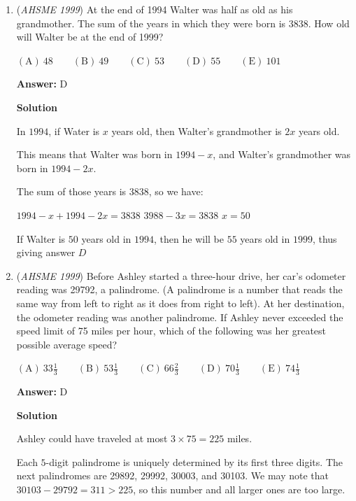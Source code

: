 \begin{enumerate}
 Three acute angles and three obtuse angles work.  For example, if you pick three acute angles of $80$ degrees, the three obtuse angles would be $160$ degrees and give a sum of $80\cdot 3 + 160\cdot 3 = 720$ degrees, which is a genuine hexagon.  Thus, the answer is $\boxed{(B) 3}$



	\item (\textit{AHSME 1999}) At the end of 1994 Walter was half as old as his grandmother. The sum of the years in which they were born is 3838. How old will Walter be at the end of 1999?


 $\mathrm{(A) \ } 48 \qquad \mathrm{(B) \ }49 \qquad \mathrm{(C) \ }53 \qquad \mathrm{(D) \ }55 \qquad \mathrm{(E) \ } 101$

 \textbf{Answer: }D



\textbf{Solution}

In $1994$, if Water is $x$ years old, then Walter's grandmother is $2x$ years old.

 This means that Walter was born in $1994 - x$, and Walter's grandmother was born in $1994 - 2x$.

 The sum of those years is $3838$, so we have:

 $1994 - x + 1994 - 2x = 3838$
$3988 - 3x = 3838$
$x = 50$

 If Walter is $50$ years old in $1994$, then he will be $55$ years old in $1999$, thus giving answer $\boxed{D}$



	\item (\textit{AHSME 1999}) Before Ashley started a three-hour drive, her car's odometer reading was 29792, a palindrome. (A palindrome is a number that reads the same way from left to right as it does from right to left). At her destination, the odometer reading was another palindrome. If Ashley never exceeded the speed limit of 75 miles per hour, which of the following was her greatest possible average speed?


 $\mathrm{(A) \ } 33\frac 13 \qquad \mathrm{(B) \ }53\frac 13 \qquad \mathrm{(C) \ }66\frac 23 \qquad \mathrm{(D) \ }70\frac 13 \qquad \mathrm{(E) \ } 74\frac 13$

 \textbf{Answer: }D



\textbf{Solution}

Ashley could have traveled at most $3\times 75 = 225$ miles.

 Each $5$-digit palindrome is uniquely determined by its first three digits. The next palindromes are 29892, 29992, 30003, and 30103. We may note that $30103-29792 = 311 > 225$, so this number and all larger ones are too large.


\end{enumerate}

